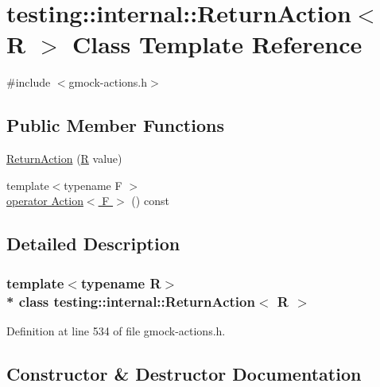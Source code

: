 \hypertarget{classtesting_1_1internal_1_1_return_action}{}\section{testing\+:\+:internal\+:\+:Return\+Action$<$ R $>$ Class Template Reference}
\label{classtesting_1_1internal_1_1_return_action}


{\ttfamily \#include $<$gmock-\/actions.\+h$>$}

\subsection*{Public Member Functions}
\begin{DoxyCompactItemize}
\item 
\hyperlink{classtesting_1_1internal_1_1_return_action_af65344e503dae3ab36b4fd6d1ede6fb7}{Return\+Action} (\hyperlink{typedefs__9_8js_afb423b73ee7b6c04d2d54fc06e405404}{R} value)
\item 
{\footnotesize template$<$typename F $>$ }\\\hyperlink{classtesting_1_1internal_1_1_return_action_a321155ed26bb50aea20d26f8603fb2ae}{operator Action$<$ F $>$} () const 
\end{DoxyCompactItemize}


\subsection{Detailed Description}
\subsubsection*{template$<$typename R$>$\\*
class testing\+::internal\+::\+Return\+Action$<$ R $>$}



Definition at line 534 of file gmock-\/actions.\+h.



\subsection{Constructor \& Destructor Documentation}
